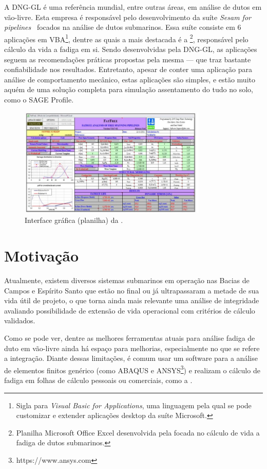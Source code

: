 A DNG-GL é uma referência mundial, entre outras áreas, em análise de dutos em vão-livre. Esta empresa é responsável pelo desenvolvimento da suíte \textit{Sesam for pipelines}~\cite{dnvsesam} focados na análise de dutos submarinos.
Essa suíte consiste em 6 aplicações em VBA\footnote{Sigla para \textit{Visual Basic for Applications}, uma linguagem pela qual se pode customizar e extender aplicações desktop da suíte Microsoft.}, dentre as quais a mais destacada é a \fatfree\footnote{Planilha Microsoft Office Excel desenvolvida pela  focada no cálculo de vida a fadiga de dutos submarinos.}, responsável pelo cálculo da vida a fadiga em si. Sendo desenvolvidas pela DNG-GL, as aplicações seguem as recomendações práticas propostas pela mesma --- que traz bastante confiabilidade nos resultados. Entretanto, apesar de conter uma aplicação para análise de comportamento mecânico, estas aplicações são simples, e estão muito aquém de uma solução completa para simulação assentamento do tudo no solo, como o SAGE Profile.

\begin{figure}[!ht]
    \centering
    \caption{Interface gráfica (planilha) da \fatfree.}\label{fig:fatfree}
    \includegraphics[width=0.8\textwidth]{imagens/fatfree}
\end{figure}


\section{Motivação}


Atualmente, existem diversos sistemas submarinos em operação nas Bacias de Campos e Espírito Santo que estão no final ou já ultrapassaram a metade de sua vida útil de projeto, o que torna ainda mais relevante uma análise de integridade avaliando possibilidade de extensão de vida operacional com critérios de cálculo validados.

Como se pode ver, dentre as melhores ferramentas atuais para análise fadiga de duto em vão-livre ainda há espaço para melhorias, especialmente no que se refere a integração. Diante dessas limitações, é comum usar um software para a análise de elementos finitos genérico (como ABAQUS e ANSYS\footnote{https://www.ansys.com}) e realizam o cálculo de fadiga em folhas de cálculo pessoais ou comerciais, como a \fatfree.

